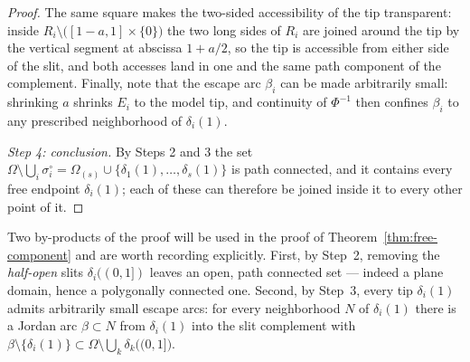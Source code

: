\documentclass[11pt,reqno]{amsart}
\theoremstyle{definition}
\theoremstyle{remark}
\begin{document}
\begin{proof}
The same square makes the two-sided accessibility of the tip transparent: inside
$R_i\setminus\bigl([1-a,1]\times\{0\}\bigr)$ the two long sides of $R_i$ are joined
around the tip by the vertical segment at abscissa $1+a/2$, so the tip is accessible
from either side of the slit, and both accesses land in one and the same path component
of the complement. Finally, note that the escape arc $\beta_i$ can be made arbitrarily
small: shrinking $a$ shrinks $E_i$ to the model tip, and continuity of $\Phi^{-1}$ then
confines $\beta_i$ to any prescribed neighborhood of $\delta_i(1)$.

\emph{Step 4: conclusion.}
By Steps 2 and 3 the set
$\Omega\setminus\bigcup_i\sigma_i^{\circ}=\Omega_{(s)}\cup\{\delta_1(1),\dots,
\delta_s(1)\}$ is path connected, and it contains every free endpoint $\delta_i(1)$;
each of these can therefore be joined inside it to every other point of it.
\end{proof}

Two by-products of the proof will be used in the proof of
Theorem~\ref{thm:free-component} and are worth recording explicitly. First, by Step~2,
removing the \emph{half-open} slits $\delta_i((0,1])$ leaves an open, path connected
set --- indeed a plane domain, hence a polygonally connected one. Second, by Step~3,
every tip $\delta_i(1)$ admits arbitrarily small escape arcs: for every neighborhood $N$
of $\delta_i(1)$ there is a Jordan arc $\beta\subset N$ from $\delta_i(1)$ into the slit
complement with $\beta\setminus\{\delta_i(1)\}\subset
\Omega\setminus\bigcup_k\delta_k\bigl((0,1]\bigr)$.
\end{document}
